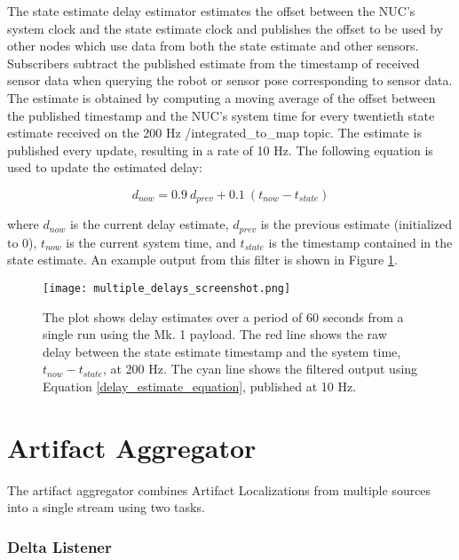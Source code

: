 The state estimate delay estimator estimates the offset between the NUC's system clock and the state estimate clock and publishes the offset to be used by other nodes which use data from both the state estimate and other sensors. Subscribers subtract the published estimate from the timestamp of received sensor data when querying the robot or sensor pose corresponding to sensor data. The estimate is obtained by computing a moving average of the offset between the published timestamp and the NUC's system time for every twentieth state estimate received on the 200 Hz /integrated\_to\_map topic. The estimate is published every update, resulting in a rate of 10 Hz. The following equation is used to update the estimated delay:

\begin{equation} \label{delay_estimate_equation}
d_{now} = 0.9 \ d_{prev} + 0.1 \ (t_{now} - t_{state})
\end{equation}

where $d_{now}$ is the current delay estimate, $d_{prev}$ is the previous estimate (initialized to 0), $t_{now}$ is the current system time, and $t_{state}$ is the timestamp contained in the state estimate. An example output from this filter is shown in Figure \ref{multiple_delays}.

\begin{figure}	
	\centering
	\texttt{[image: multiple\_delays\_screenshot.png]}
	\caption[Raw and filtered state estimation delay]{The plot shows delay estimates over a period of 60 seconds from a single run using the Mk. 1 payload. The red line shows the raw delay between the state estimate timestamp and the system time, $t_{now} - t_{state}$, at 200 Hz. The cyan line shows the filtered output using Equation \ref{delay_estimate_equation}, published at 10 Hz.}
	\label{multiple_delays}
\end{figure}

\section{Artifact Aggregator}

The artifact aggregator combines Artifact Localizations from multiple sources into a single stream using two tasks. 

\subsubsection{Delta Listener}

